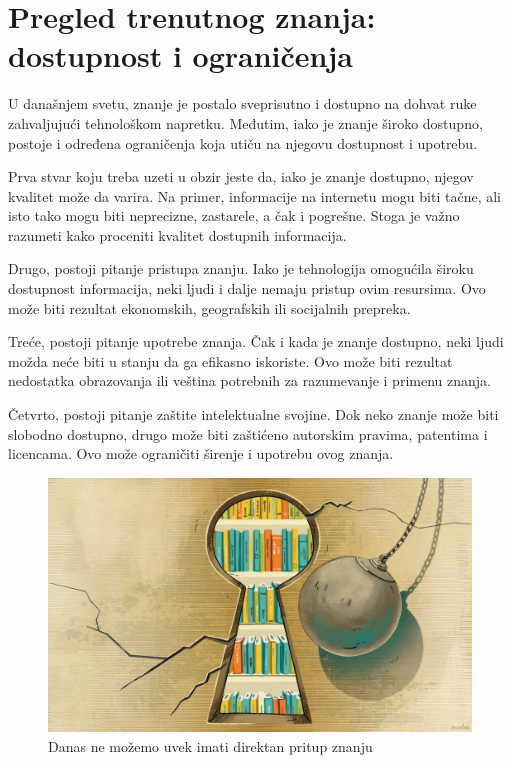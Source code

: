 \documentclass{article}
\begin{document}

\section{Pregled trenutnog znanja: dostupnost i ograničenja}

U današnjem svetu, znanje je postalo sveprisutno i dostupno na dohvat ruke zahvaljujući tehnološkom napretku. Međutim, iako je znanje široko dostupno, postoje i određena ograničenja koja utiču na njegovu dostupnost i upotrebu.

Prva stvar koju treba uzeti u obzir jeste da, iako je znanje dostupno, njegov kvalitet može da varira. Na primer, informacije na internetu mogu biti tačne, ali isto tako mogu biti neprecizne, zastarele, a čak i pogrešne. Stoga je važno razumeti kako proceniti kvalitet dostupnih informacija.

Drugo, postoji pitanje pristupa znanju. Iako je tehnologija omogućila široku dostupnost informacija, neki ljudi i dalje nemaju pristup ovim resursima. Ovo može biti rezultat ekonomskih, geografskih ili socijalnih prepreka.

Treće, postoji pitanje upotrebe znanja. Čak i kada je znanje dostupno, neki ljudi možda neće biti u stanju da ga efikasno iskoriste. Ovo može biti rezultat nedostatka obrazovanja ili veština potrebnih za razumevanje i primenu znanja.

Četvrto, postoji pitanje zaštite intelektualne svojine. Dok neko znanje može biti slobodno dostupno, drugo može biti zaštićeno autorskim pravima, patentima i licencama. Ovo može ograničiti širenje i upotrebu ovog znanja.

\begin{figure}[htbp]
    \center
    \includegraphics[scale=0.2]{img/lock.png}
    \caption{Danas ne možemo uvek imati direktan pritup znanju}
\end{figure}
\end{document}
